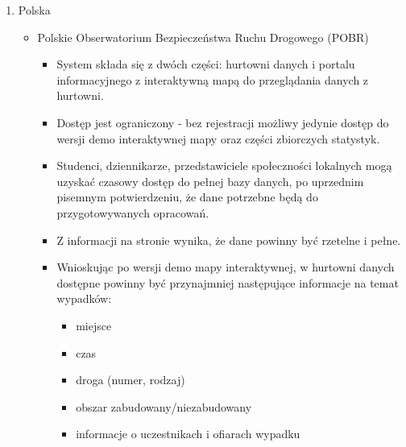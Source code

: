\begin{enumerate}
\item
  Polska

  \begin{itemize}
  \item
    Polskie Obserwatorium Bezpieczeństwa Ruchu Drogowego (POBR) \cite{pobr}

    \begin{itemize}
    \item
      System składa się z dwóch części: hurtowni danych i portalu
      informacyjnego z interaktywną mapą do przeglądania danych z
      hurtowni.\\
    \item
      Dostęp jest ograniczony - bez rejestracji możliwy jedynie dostęp
      do wersji demo interaktywnej mapy oraz części zbiorczych
      statystyk.\\
    \item
      Studenci, dziennikarze, przedstawiciele społeczności lokalnych
      mogą uzyskać czasowy dostęp do pełnej bazy danych, po uprzednim
      pisemnym potwierdzeniu, że dane potrzebne będą do przygotowywanych
      opracowań.\\
    \item
      Z informacji na stronie wynika, że dane powinny być rzetelne i
      pełne.\\
    \item
      Wnioskując po wersji demo mapy interaktywnej, w hurtowni danych
      dostępne powinny być przynajmniej następujące informacje na temat
      wypadków:

      \begin{itemize}
      \item
        miejsce\\
      \item
        czas\\
      \item
        droga (numer, rodzaj)\\
      \item
        obszar zabudowany/niezabudowany\\
      \item
        informacje o uczestnikach i ofiarach wypadku


\end{itemize}
\end{itemize}
\end{itemize}
\end{enumerate}
